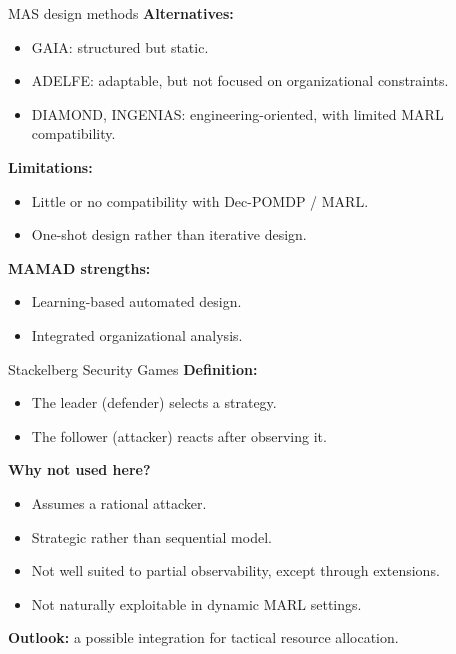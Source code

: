\begin{frame}{MAS design methods}
    \textbf{Alternatives:}
    \begin{itemize}
        \item GAIA: structured but static.
        \item ADELFE: adaptable, but not focused on organizational constraints.
        \item DIAMOND, INGENIAS: engineering-oriented, with limited MARL compatibility.
    \end{itemize}

    \textbf{Limitations:}
    \begin{itemize}
        \item Little or no compatibility with Dec-POMDP / MARL.
        \item One-shot design rather than iterative design.
    \end{itemize}

    \textbf{MAMAD strengths:}
    \begin{itemize}
        \item Learning-based automated design.
        \item Integrated organizational analysis.
    \end{itemize}
\end{frame}

\begin{frame}{Stackelberg Security Games}
    \textbf{Definition:}
    \begin{itemize}
        \item The leader (defender) selects a strategy.
        \item The follower (attacker) reacts after observing it.
    \end{itemize}

    \textbf{Why not used here?}
    \begin{itemize}
        \item Assumes a rational attacker.
        \item Strategic rather than sequential model.
        \item Not well suited to partial observability, except through extensions.
        \item Not naturally exploitable in dynamic MARL settings.
    \end{itemize}

    \textbf{Outlook:} a possible integration for tactical resource allocation.
\end{frame}

